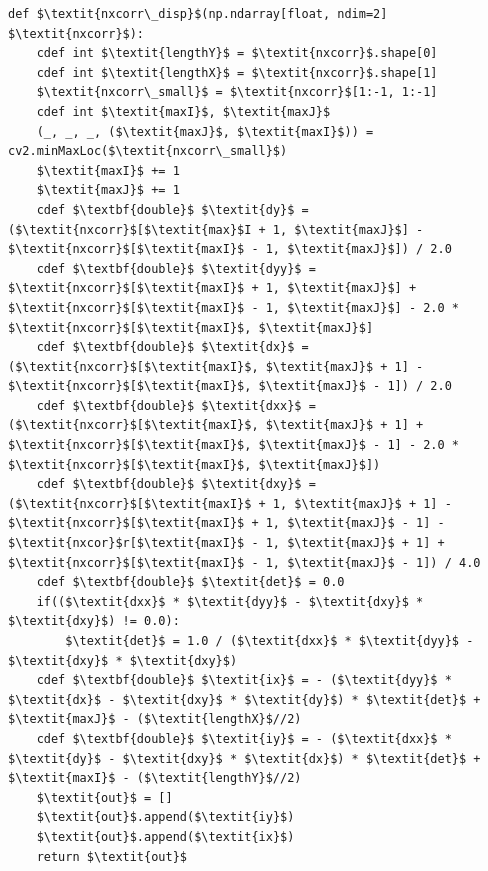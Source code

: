\begin{lstlisting}[caption={Die in Cython optimierte Funktion nxcorr\_disp()}, label={lst:cython_nxd}]
def $\textit{nxcorr\_disp}$(np.ndarray[float, ndim=2] $\textit{nxcorr}$):
	cdef int $\textit{lengthY}$ = $\textit{nxcorr}$.shape[0]
	cdef int $\textit{lengthX}$ = $\textit{nxcorr}$.shape[1]
	$\textit{nxcorr\_small}$ = $\textit{nxcorr}$[1:-1, 1:-1]
	cdef int $\textit{maxI}$, $\textit{maxJ}$
	(_, _, _, ($\textit{maxJ}$, $\textit{maxI}$)) = cv2.minMaxLoc($\textit{nxcorr\_small}$)
	$\textit{maxI}$ += 1
	$\textit{maxJ}$ += 1
	cdef $\textbf{double}$ $\textit{dy}$ = ($\textit{nxcorr}$[$\textit{max}$I + 1, $\textit{maxJ}$] - $\textit{nxcorr}$[$\textit{maxI}$ - 1, $\textit{maxJ}$]) / 2.0
	cdef $\textbf{double}$ $\textit{dyy}$ = $\textit{nxcorr}$[$\textit{maxI}$ + 1, $\textit{maxJ}$] + $\textit{nxcorr}$[$\textit{maxI}$ - 1, $\textit{maxJ}$] - 2.0 * $\textit{nxcorr}$[$\textit{maxI}$, $\textit{maxJ}$]
	cdef $\textbf{double}$ $\textit{dx}$ = ($\textit{nxcorr}$[$\textit{maxI}$, $\textit{maxJ}$ + 1] - $\textit{nxcorr}$[$\textit{maxI}$, $\textit{maxJ}$ - 1]) / 2.0
	cdef $\textbf{double}$ $\textit{dxx}$ = ($\textit{nxcorr}$[$\textit{maxI}$, $\textit{maxJ}$ + 1] + $\textit{nxcorr}$[$\textit{maxI}$, $\textit{maxJ}$ - 1] - 2.0 * $\textit{nxcorr}$[$\textit{maxI}$, $\textit{maxJ}$])
	cdef $\textbf{double}$ $\textit{dxy}$ = ($\textit{nxcorr}$[$\textit{maxI}$ + 1, $\textit{maxJ}$ + 1] - $\textit{nxcorr}$[$\textit{maxI}$ + 1, $\textit{maxJ}$ - 1] - $\textit{nxcor}$r[$\textit{maxI}$ - 1, $\textit{maxJ}$ + 1] + $\textit{nxcorr}$[$\textit{maxI}$ - 1, $\textit{maxJ}$ - 1]) / 4.0
	cdef $\textbf{double}$ $\textit{det}$ = 0.0
	if(($\textit{dxx}$ * $\textit{dyy}$ - $\textit{dxy}$ * $\textit{dxy}$) != 0.0):
		$\textit{det}$ = 1.0 / ($\textit{dxx}$ * $\textit{dyy}$ - $\textit{dxy}$ * $\textit{dxy}$)
	cdef $\textbf{double}$ $\textit{ix}$ = - ($\textit{dyy}$ * $\textit{dx}$ - $\textit{dxy}$ * $\textit{dy}$) * $\textit{det}$ + $\textit{maxJ}$ - ($\textit{lengthX}$//2)
	cdef $\textbf{double}$ $\textit{iy}$ = - ($\textit{dxx}$ * $\textit{dy}$ - $\textit{dxy}$ * $\textit{dx}$) * $\textit{det}$ + $\textit{maxI}$ - ($\textit{lengthY}$//2)
	$\textit{out}$ = []
	$\textit{out}$.append($\textit{iy}$)
	$\textit{out}$.append($\textit{ix}$)
	return $\textit{out}$
\end{lstlisting}